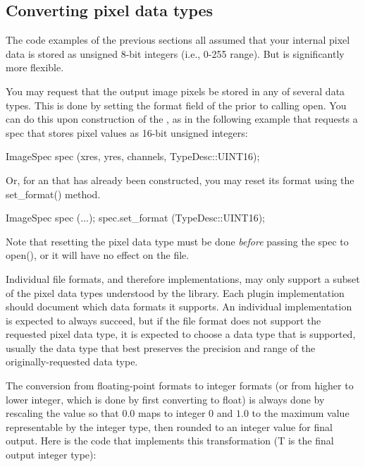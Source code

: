 \subsection{Converting pixel data types}
\label{sec:imageoutput:convertingtypes}

The code examples of the previous sections all assumed that your
internal pixel data is stored as unsigned 8-bit integers (i.e., 0-255
range).  But \product is significantly more flexible.  

You may request that the output image pixels be stored in any of several
data types.  This is done by setting the {\kw format} field of the
\ImageSpec prior to calling {\kw open}.  You can do this upon
construction of the \ImageSpec, as in the following example
that requests a spec that stores pixel values as 16-bit unsigned integers:
\begin{code}
        ImageSpec spec (xres, yres, channels, TypeDesc::UINT16);
\end{code}

\noindent Or, for an \ImageSpec that has already been
constructed, you may reset its format using the {\kw set_format()}
method.

\begin{code}
        ImageSpec spec (...);
        spec.set_format (TypeDesc::UINT16);
\end{code}

Note that resetting the pixel data type must be done \emph{before} passing
the spec to {\kw open()}, or it will have no effect on the file.

Individual file formats, and therefore \ImageOutput implementations, may
only support a subset of the pixel data types understood by the \product library.
Each \ImageOutput plugin implementation should document which data
formats it supports.  An individual \ImageOutput implementation is expected
to always succeed, but if the file format does not support the requested
pixel data type, it is expected to choose a data type that is supported,
usually the data type that best preserves the precision and range
of the originally-requested data type.


The conversion from floating-point formats to integer formats (or from
higher to lower integer, which is done by first converting to float) is
always done by rescaling the value so that $0.0$ maps to integer $0$ and
$1.0$ to the maximum value representable by the integer type, then rounded
to an integer value for final output.  Here is the code that implements this
transformation ({\cf T} is the final output integer type):

